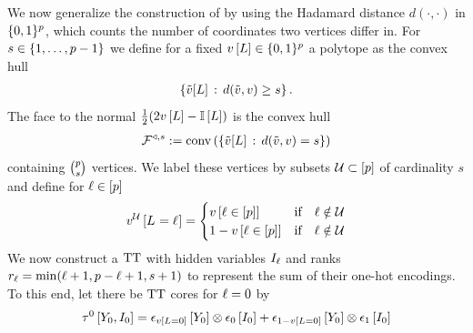 \begin{example}
    \label{exa:gen_tt_diagonal_face}


    We now generalize the construction of  by using the Hadamard distance $d(\cdot,\cdot)$ in $\{0,1\}^{p}$, which counts the number of coordinates two vertices differ in.
    For $s\in\{1,\ldots,p-1\}$ we define for a fixed $v\left[L\right]\in\{0,1\}^{p}$ a polytope as the convex hull
    \begin{align*}
        \{\tilde{v}[L] \,:\, d(\tilde{v},v)\geq s\}  \, .
    \end{align*}
    The face to the normal $\frac{1}{2} (2v\left[L\right] - \mathbb{I}\left[L\right])$ is the convex hull
    \begin{align*}
        \mathcal{F}^{\triangleleft,s}:= \mathrm{conv}\left(
            \{\tilde{v}[L] \,:\, d(\tilde{v},v) = s\}
        \right)
    \end{align*}
    containing $\binom{p}{s}$ vertices.
    We label these vertices by subsets $\mathcal{U}\subset[p]$ of cardinality $s$ and define for $\ell\in[p]$
    \begin{align*}
        v^{\mathcal{U}}\left[L_{}=\ell_{}\right] =
        \begin{cases}
            v\left[\ell\in[p]\right] & \text{if}\quad \ell\notin\mathcal{U} \\
            1-v\left[\ell\in[p]\right] & \text{if}\quad \ell\notin\mathcal{U}
        \end{cases}
    \end{align*}
    We now construct a $\mathrm{TT}$ with hidden variables $I_{\ell}$ and ranks $r_{\ell} = \min (\ell+1,p-\ell+1, s+1)$ to represent the sum of their one-hot encodings.
    To this end, let there be $\mathrm{TT}$ cores for $\ell=0$ by
    \begin{align*}
        \hypercoreofat{0}{\headvariableof{0},\decvariableof{0}}
        = \onehotmapofat{\imelementat{\selvariable=0}}{\headvariableof{0}} \otimes \fbasisat{\decvariableof{0}}
        + \onehotmapofat{1-\imelementat{\selvariable=0}}{\headvariableof{0}} \otimes \tbasisat{\decvariableof{0}}

\end{align*}
\end{example}
